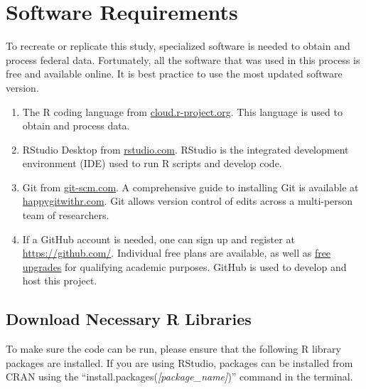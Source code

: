 \documentclass[
]{book}
\begin{document}
\hypertarget{software-requirements}{%
\chapter{Software Requirements}\label{software-requirements}}

To recreate or replicate this study, specialized software is needed to obtain and process federal data. Fortunately, all the software that was used in this process is free and available online. It is best practice to use the most updated software version.

\begin{enumerate}
\def\labelenumi{\arabic{enumi}.}
\item
  The R coding language from \href{https://cloud.r-project.org/}{cloud.r-project.org}. This language is used to obtain and process data.
\item
  RStudio Desktop from \href{https://rstudio.com/products/rstudio/download/\#download}{rstudio.com}. RStudio is the integrated development environment (IDE) used to run R scripts and develop code.
\item
  Git from \href{https://git-scm.com/downloads}{git-scm.com}. A comprehensive guide to installing Git is available at \href{https://happygitwithr.com/install-git.html}{happygitwithr.com}. Git allows version control of edits across a multi-person team of researchers.
\item
  If a GitHub account is needed, one can sign up and register at \url{https://github.com/}. Individual free plans are available, as well as \href{https://help.github.com/en/articles/applying-for-an-educator-or-researcher-discount}{free upgrades} for qualifying academic purposes. GitHub is used to develop and host this project.
\end{enumerate}

\hypertarget{download-necessary-r-libraries}{%
\section{Download Necessary R Libraries}\label{download-necessary-r-libraries}}

To make sure the code can be run, please ensure that the following R library packages are installed. If you are using RStudio, packages can be installed from CRAN using the ``install.packages(\emph{{[}package\_name{]}})'' command in the terminal.
\end{document}
